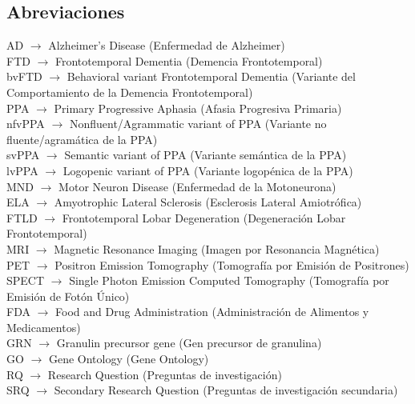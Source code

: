 \documentclass{bmcart}
\begin{document}
	\begin{backmatter}
	
		\section*{Abreviaciones}%
			AD $\rightarrow$ Alzheimer’s Disease (Enfermedad de Alzheimer)\\
			FTD $\rightarrow$ Frontotemporal Dementia (Demencia Frontotemporal)\\
			bvFTD $\rightarrow$ Behavioral variant Frontotemporal Dementia (Variante del Comportamiento de la Demencia Frontotemporal)\\
			PPA $\rightarrow$ Primary Progressive Aphasia (Afasia Progresiva Primaria)\\
			nfvPPA $\rightarrow$ Nonfluent/Agrammatic variant of PPA (Variante no fluente/agramática de la PPA)\\
			svPPA $\rightarrow$ Semantic variant of PPA (Variante semántica de la PPA)\\
			lvPPA $\rightarrow$ Logopenic variant of PPA (Variante logopénica de la PPA)\\
			MND $\rightarrow$ Motor Neuron Disease (Enfermedad de la Motoneurona)\\
			ELA $\rightarrow$ Amyotrophic Lateral Sclerosis (Esclerosis Lateral Amiotrófica)\\
			FTLD $\rightarrow$ Frontotemporal Lobar Degeneration (Degeneración Lobar Frontotemporal)\\
			MRI $\rightarrow$ Magnetic Resonance Imaging (Imagen por Resonancia Magnética)\\
			PET $\rightarrow$ Positron Emission Tomography (Tomografía por Emisión de Positrones)\\
			SPECT $\rightarrow$ Single Photon Emission Computed Tomography (Tomografía por Emisión de Fotón Único)\\
			FDA $\rightarrow$ Food and Drug Administration (Administración de Alimentos y Medicamentos)\\
			GRN $\rightarrow$ Granulin precursor gene (Gen precursor de granulina)\\
			GO $\rightarrow$ Gene Ontology (Gene Ontology) \\
			RQ $\rightarrow$ Research Question (Preguntas de investigación) \\
			SRQ $\rightarrow$ Secondary Research Question (Preguntas de investigación secundaria)			\\
			

\end{backmatter}
\end{document}
